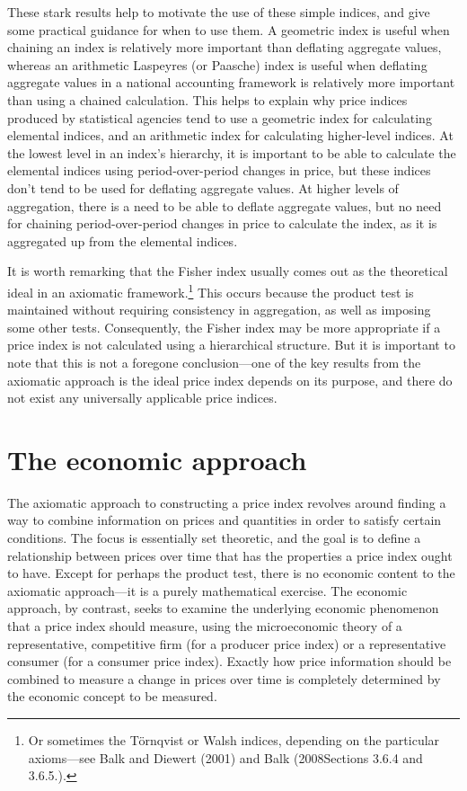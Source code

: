 \documentclass[
]{article}
\begin{document}
These stark results help to motivate the use of these simple indices, and give some practical guidance for when to use them. A geometric index is useful when chaining an index is relatively more important than deflating aggregate values, whereas an arithmetic Laspeyres (or Paasche) index is useful when deflating aggregate values in a national accounting framework is relatively more important than using a chained calculation. This helps to explain why price indices produced by statistical agencies tend to use a geometric index for calculating elemental indices, and an arithmetic index for calculating higher-level indices. At the lowest level in an index's hierarchy, it is important to be able to calculate the elemental indices using period-over-period changes in price, but these indices don't tend to be used for deflating aggregate values. At higher levels of aggregation, there is a need to be able to deflate aggregate values, but no need for chaining period-over-period changes in price to calculate the index, as it is aggregated up from the elemental indices.

It is worth remarking that the Fisher index usually comes out as the theoretical ideal in an axiomatic framework.\footnote{Or sometimes the Törnqvist or Walsh indices, depending on the particular axioms---see Balk and Diewert (2001) and Balk (2008Sections 3.6.4 and 3.6.5.).} This occurs because the product test is maintained without requiring consistency in aggregation, as well as imposing some other tests. Consequently, the Fisher index may be more appropriate if a price index is not calculated using a hierarchical structure. But it is important to note that this is not a foregone conclusion---one of the key results from the axiomatic approach is the ideal price index depends on its purpose, and there do not exist any universally applicable price indices.

\hypertarget{the-economic-approach}{%
\section{The economic approach}\label{the-economic-approach}}

The axiomatic approach to constructing a price index revolves around finding a way to combine information on prices and quantities in order to satisfy certain conditions. The focus is essentially set theoretic, and the goal is to define a relationship between prices over time that has the properties a price index ought to have. Except for perhaps the product test, there is no economic content to the axiomatic approach---it is a purely mathematical exercise. The economic approach, by contrast, seeks to examine the underlying economic phenomenon that a price index should measure, using the microeconomic theory of a representative, competitive firm (for a producer price index) or a representative consumer (for a consumer price index). Exactly how price information should be combined to measure a change in prices over time is completely determined by the economic concept to be measured.
\end{document}
